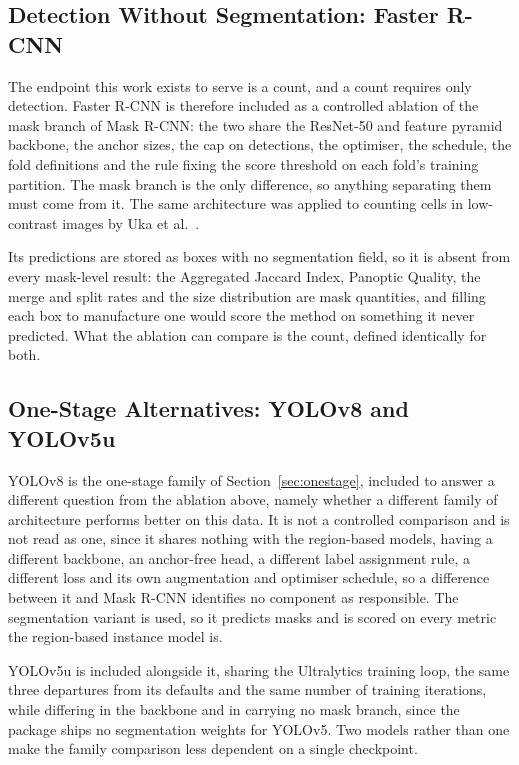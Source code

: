 \subsection{Detection Without Segmentation: Faster R-CNN}

The endpoint this work exists to serve is a count, and a count requires only
detection. Faster R-CNN \cite{ren2015faster} is therefore included as a controlled
ablation of the mask branch of Mask R-CNN: the two share the ResNet-50 and feature
pyramid backbone, the anchor sizes, the cap on detections, the optimiser, the
schedule, the fold definitions and the rule fixing the score threshold on each
fold's training partition. The mask branch is the only difference, so anything separating
them must come from it. The same architecture was applied to counting
cells in low-contrast images by Uka et al.\ \cite{uka2020faster}.

Its predictions are stored as boxes with no segmentation field, so it is absent
from every mask-level result: the Aggregated Jaccard Index, Panoptic Quality, the
merge and split rates and the size distribution are mask quantities, and filling
each box to manufacture one would score the method on something it never
predicted. What the ablation can compare is the count, defined identically for
both.

\subsection{One-Stage Alternatives: YOLOv8 and YOLOv5u}

YOLOv8 \cite{redmon2016yolo, jocher2023ultralytics} is the one-stage family of
Section~\ref{sec:onestage}, included to answer a different question from the
ablation above, namely whether a different family of architecture performs better
on this data. It is not a controlled comparison and is not read as one, since it
shares nothing with the region-based models, having a different backbone, an
anchor-free head, a different label assignment rule, a different loss and its own
augmentation and optimiser schedule, so a difference between it and Mask R-CNN identifies
no component as responsible. The segmentation variant is used, so it predicts
masks and is scored on every metric the region-based instance model is.

YOLOv5u is included alongside it, sharing the Ultralytics training loop, the same
three departures from its defaults and the same number of training iterations, while differing
in the backbone and in carrying no mask branch, since the package ships no
segmentation weights for YOLOv5. Two models rather than one make the family
comparison less dependent on a single checkpoint.

